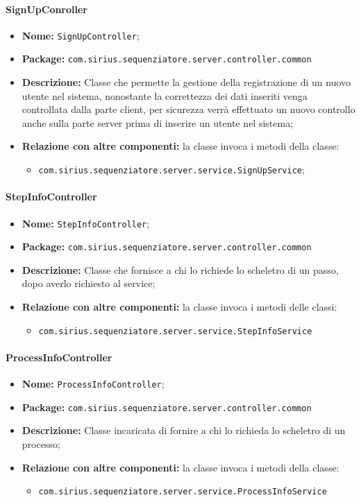 \paragraph{SignUpConroller}
	\begin{itemize}
		\item \textbf{Nome:} \texttt{SignUpController};
		\item \textbf{Package:} \texttt{com.sirius.sequenziatore.server.controller.common}
		\item \textbf{Descrizione:} Classe che permette la gestione della registrazione di un nuovo utente nel sistema, nonostante la correttezza dei dati inseriti venga controllata dalla parte client, per sicurezza verrà effettuato un nuovo controllo anche sulla parte server prima di inserire un utente nel sistema;
		\item \textbf{Relazione con altre componenti:} la classe invoca i metodi della classe:
		\begin{itemize}
			\item \texttt{com.sirius.sequenziatore.server.service.SignUpService};
		\end{itemize}
	\end{itemize}
\paragraph{StepInfoController}
	\begin{itemize}
		\item \textbf{Nome:} \texttt{StepInfoController};
		\item \textbf{Package:} \texttt{com.sirius.sequenziatore.server.controller.common}
		\item \textbf{Descrizione:} Classe che fornisce a chi lo richiede lo scheletro di un passo, dopo averlo richiesto al service;
		\item \textbf{Relazione con altre componenti:} la classe invoca i metodi delle classi:
		\begin{itemize}
			\item \texttt{com.sirius.sequenziatore.server.service.StepInfoService}
		\end{itemize}
	\end{itemize}
\paragraph{ProcessInfoController}
	\begin{itemize}
		\item \textbf{Nome:} \texttt{ProcessInfoController};
		\item \textbf{Package:} \texttt{com.sirius.sequenziatore.server.controller.common}
		\item \textbf{Descrizione:} Classe incaricata di fornire a chi lo richieda lo scheletro di un processo;
		\item \textbf{Relazione con altre componenti:} la classe invoca i metodi della classe:
		\begin{itemize}
			\item \texttt{com.sirius.sequenziatore.server.service.ProcessInfoService}
		\end{itemize}
	\end{itemize}

